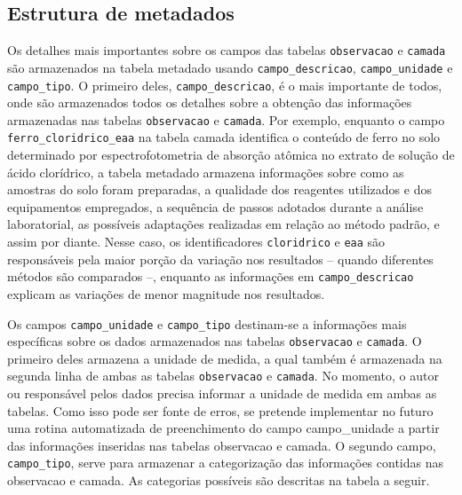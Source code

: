 \documentclass[a4paper,dvipsnames]{tufte-book}
\begin{document}
\subsection{Estrutura de metadados}\label{estrutura-de-metadados}

Os detalhes mais importantes sobre os campos das tabelas
\texttt{observacao} e \texttt{camada} são armazenados na tabela metadado
usando \texttt{campo\_descricao}, \texttt{campo\_unidade} e
\texttt{campo\_tipo}. O primeiro deles, \texttt{campo\_descricao}, é o
mais importante de todos, onde são armazenados todos os detalhes sobre a
obtenção das informações armazenadas nas tabelas \texttt{observacao} e
\texttt{camada}. Por exemplo, enquanto o campo
\texttt{ferro\_cloridrico\_eaa} na tabela camada identifica o conteúdo
de ferro no solo determinado por espectrofotometria de absorção atômica
no extrato de solução de ácido clorídrico, a tabela metadado armazena
informações sobre como as amostras do solo foram preparadas, a qualidade
dos reagentes utilizados e dos equipamentos empregados, a sequência de
passos adotados durante a análise laboratorial, as possíveis adaptações
realizadas em relação ao método padrão, e assim por diante. Nesse caso,
os identificadores \texttt{cloridrico} e \texttt{eaa} são responsáveis
pela maior porção da variação nos resultados -- quando diferentes
métodos são comparados --, enquanto as informações em
\texttt{campo\_descricao} explicam as variações de menor magnitude nos
resultados.

Os campos \texttt{campo\_unidade} e \texttt{campo\_tipo} destinam-se a
informações mais específicas sobre os dados armazenados nas tabelas
\texttt{observacao} e \texttt{camada}. O primeiro deles armazena a
unidade de medida, a qual também é armazenada na segunda linha de ambas
as tabelas \texttt{observacao} e \texttt{camada}. No momento, o autor ou
responsável pelos dados precisa informar a unidade de medida em ambas as
tabelas. Como isso pode ser fonte de erros, se pretende implementar no
futuro uma rotina automatizada de preenchimento do campo campo\_unidade
a partir das informações inseridas nas tabelas observacao e camada. O
segundo campo, \texttt{campo\_tipo}, serve para armazenar a
categorização das informações contidas nas observacao e camada. As
categorias possíveis são descritas na tabela a seguir.
\end{document}
